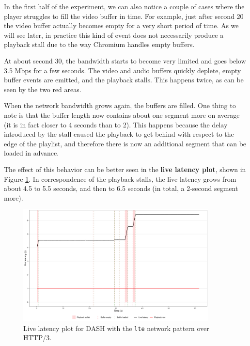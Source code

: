 In the first half of the experiment, we can also notice a couple of cases where the player struggles to fill the video buffer in time. For example, just after second 20 the video buffer actually becomes empty for a very short period of time. As we will see later, in practice this kind of event does not necessarily produce a playback stall due to the way Chromium handles empty buffers.

At about second 30, the bandwidth starts to become very limited and goes below 3.5 Mbps for a few seconds. The video and audio buffers quickly deplete, empty buffer events are emitted, and the playback stalls. This happens twice, as can be seen by the two red areas.

When the network bandwidth grows again, the buffers are filled. One thing to note is that the buffer length now contains about one segment more on average (it is in fact closer to 4 seconds than to 2). This happens because the delay introduced by the stall caused the playback to get behind with respect to the edge of the playlist, and therefore there is now an additional segment that can be loaded in advance.

The effect of this behavior can be better seen in the \textbf{live latency plot}, shown in Figure \ref{fig:eval_nonabr_lte_h3_latency}. In correspondence of the playback stalls, the live latency grows from about 4.5 to 5.5 seconds, and then to 6.5 seconds (in total, a 2-second segment more).

\begin{figure}[h]
    \centering
    \includegraphics[width=0.9\textwidth]{res/eval_nonabr_lte_h3_latency.png}
    \caption{Live latency plot for DASH with the \texttt{lte} network pattern over HTTP/3.}
    \label{fig:eval_nonabr_lte_h3_latency}
\end{figure}

